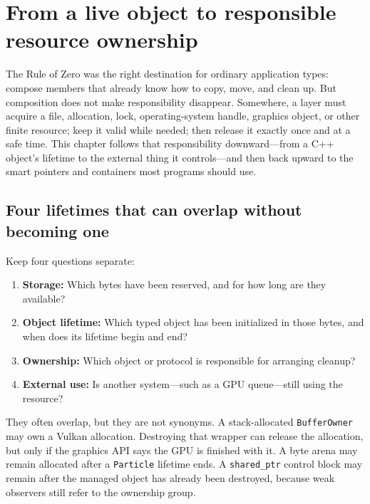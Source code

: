 \section{From a live object to responsible resource ownership}\label{05-engine-i-ch004-from-a-live-object-to-responsible-resource-ownership}

The Rule of Zero was the right destination for ordinary application types: compose members that already know how to copy, move, and clean up. But composition does not make responsibility disappear. Somewhere, a layer must acquire a file, allocation, lock, operating-system handle, graphics object, or other finite resource; keep it valid while needed; then release it exactly once and at a safe time. This chapter follows that responsibility downward---from a C++ object's lifetime to the external thing it controls---and then back upward to the smart pointers and containers most programs should use.

\subsection{Four lifetimes that can overlap without becoming one}\label{05-engine-i-ch004-four-lifetimes-that-can-overlap-without-becoming-one}

Keep four questions separate:

\begin{enumerate}
\def\labelenumi{\arabic{enumi}.}
\tightlist
\item
  \textbf{Storage:} Which bytes have been reserved, and for how long are they available?
\item
  \textbf{Object lifetime:} Which typed object has been initialized in those bytes, and when does its lifetime begin and end?
\item
  \textbf{Ownership:} Which object or protocol is responsible for arranging cleanup?
\item
  \textbf{External use:} Is another system---such as a GPU queue---still using the resource?
\end{enumerate}

They often overlap, but they are not synonyms. A stack-allocated \texttt{BufferOwner} may own a Vulkan allocation. Destroying that wrapper can release the allocation, but only if the graphics API says the GPU is finished with it. A byte arena may remain allocated after a \texttt{Particle} lifetime ends. A \texttt{shared\_ptr} control block may remain after the managed object has already been destroyed, because weak observers still refer to the ownership group.

